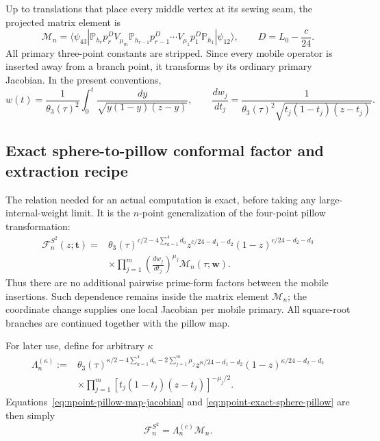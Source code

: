 \documentclass[11pt]{article}
\newcommand{\cF}{\mathcal F}
\newcommand{\cM}{\mathcal M}
\newcommand{\PP}{\mathbb P}
\begin{document}
Up to translations that place every middle vertex at its sewing seam, the
projected matrix element is
\begin{equation}
\boxed{
 \cM_n=
 \langle\psi_{43}|\PP_{h_r}p_r^{D}V_{\mu_m}
 \PP_{h_{r-1}}p_{r-1}^{D}\cdots
 V_{\mu_1}p_1^{D}\PP_{h_1}|\psi_{12}\rangle,
 \qquad D=L_0-\frac{c}{24}.}
 \label{eq:npoint-pillow-matrix-element}
\end{equation}
All primary three-point constants are stripped.  Since every mobile
operator is inserted away from a branch point, it transforms by its ordinary
primary Jacobian.  In the present conventions,
\begin{equation}
 w(t)=\frac{1}{\theta_3(\tau)^2}
 \int_0^t\frac{dy}{\sqrt{y(1-y)(z-y)}},
 \qquad
 \frac{dw_j}{dt_j}=
 \frac{1}{\theta_3(\tau)^2
 \sqrt{t_j(1-t_j)(z-t_j)}}.
 \label{eq:npoint-pillow-map-jacobian}
\end{equation}

\subsection{Exact sphere-to-pillow conformal factor and extraction recipe}

The relation needed for an actual computation is exact, before taking any
large-internal-weight limit.  It is the $n$-point generalization of the
four-point pillow transformation:
\begin{equation}
 \boxed{\begin{aligned}
 \cF_n^{S^2}(z;\boldsymbol t)
 ={}&
 \theta_3(\tau)^{c/2-4\sum_{a=1}^{4}d_a}
 z^{c/24-d_1-d_2}(1-z)^{c/24-d_2-d_3}
 \\[-1mm]
 &\times
 \prod_{j=1}^{m}\left(\frac{dw_j}{dt_j}\right)^{\mu_j}
 \cM_n(\tau;\boldsymbol w).
 \end{aligned}}
 \label{eq:npoint-exact-sphere-pillow}
\end{equation}
Thus there are no additional pairwise prime-form factors between the
mobile insertions.  Such dependence remains inside the matrix element
$\cM_n$; the coordinate change supplies one local Jacobian per mobile
primary.  All square-root branches are continued together with the pillow
map.

For later use, define for arbitrary $\kappa$
\begin{align}
 \Lambda_n^{(\kappa)}
 :={}&
 \theta_3(\tau)^{\kappa/2-4\sum_{a=1}^{4}d_a
                         -2\sum_{j=1}^{m}\mu_j}
 z^{\kappa/24-d_1-d_2}(1-z)^{\kappa/24-d_2-d_3}
 \nonumber\\[-1mm]
 &\times\prod_{j=1}^{m}
 [t_j(1-t_j)(z-t_j)]^{-\mu_j/2}.
 \label{eq:npoint-lambda}
\end{align}
Equations~\eqref{eq:npoint-pillow-map-jacobian} and
\eqref{eq:npoint-exact-sphere-pillow} are then simply
\begin{equation}
 \boxed{\cF_n^{S^2}=\Lambda_n^{(c)}\cM_n.}
 \label{eq:npoint-exact-lambda-relation}
\end{equation}
\end{document}

